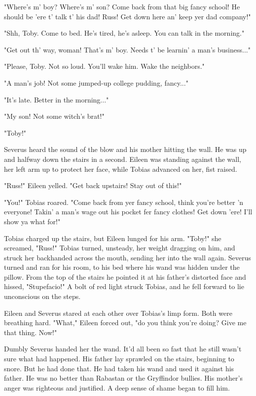 \documentclass[a4paper,11pt]{article}
\begin{document}
"Where's m' boy? Where's m' son? Come back from that big fancy school! He should be 'ere t' talk t' his dad! Russ! Get down here an' keep yer dad company!"

"Shh, Toby. Come to bed. He's tired, he's asleep. You can talk in the morning."

"Get out th' way, woman! That's m' boy. Needs t' be learnin' a man's business..."

"Please, Toby. Not so loud. You'll wake him. Wake the neighbors."

"A man's job! Not some jumped-up college pudding, fancy..."

"It's late. Better in the morning..."

"My son! Not some witch's brat!"

"Toby!"

Severus heard the sound of the blow and his mother hitting the wall. He was up and halfway down the stairs in a second. Eileen was standing against the wall, her left arm up to protect her face, while Tobias advanced on her, fist raised.

"Russ!" Eileen yelled. "Get back upstairs! Stay out of this!"

"You!" Tobias roared. "Come back from yer fancy school, think you're better 'n everyone! Takin' a man's wage out his pocket fer fancy clothes! Get down 'ere! I'll show ya what for!"

Tobias charged up the stairs, but Eileen lunged for his arm. "Toby!" she screamed, "Russ!" Tobias turned, unsteady, her weight dragging on him, and struck her backhanded across the mouth, sending her into the wall again. Severus turned and ran for his room, to his bed where his wand was hidden under the pillow. From the top of the stairs he pointed it at his father's distorted face and hissed, "Stupefacio!" A bolt of red light struck Tobias, and he fell forward to lie unconscious on the steps.

Eileen and Severus stared at each other over Tobias's limp form. Both were breathing hard. "What," Eileen forced out, "do you think you're doing? Give me that thing. Now!"

Dumbly Severus handed her the wand. It'd all been so fast that he still wasn't sure what had happened. His father lay sprawled on the stairs, beginning to snore. But he had done that. He had taken his wand and used it against his father. He was no better than Rabastan or the Gryffindor bullies. His mother's anger was righteous and justified. A deep sense of shame began to fill him.
\end{document}
